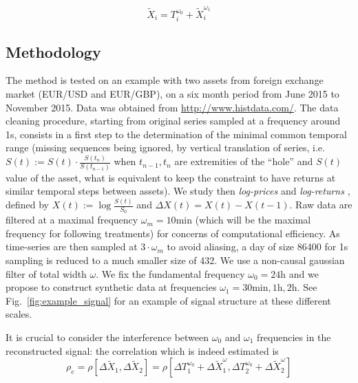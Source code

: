 \documentclass{bmcart}
\begin{document}
\begin{equation}
\tilde{X}_i = T_i^{\omega_0} + \tilde{X}_i^{\omega_1}
\end{equation}



\subsection*{Methodology}

The method is tested on an example with two assets from foreign exchange market (EUR/USD and EUR/GBP), on a six month period from June 2015 to November 2015. Data was obtained from \url{http://www.histdata.com/}. The data cleaning procedure, starting from original series sampled at a frequency around 1s, consists in a first step to the determination of the minimal common temporal range (missing sequences being ignored, by vertical translation of series, i.e. $S(t):=S(t)\cdot \frac{S(t_{n})}{S(t_{n-1})}$ when $t_{n-1},t_n$ are extremities of the ``hole'' and $S(t)$ value of the asset, what is equivalent to keep the constraint to have returns at similar temporal steps between assets). We study then \emph{log-prices} and \emph{log-returns} \cite{mantegna1999introduction}, defined by $X(t):=\log{\frac{S(t)}{S_0}}$ and $\Delta X (t) = X(t) - X(t-1)$. Raw data are filtered at a maximal frequency $\omega_m = 10\textrm{min}$ (which will be the maximal frequency for following treatments) for concerns of computational efficiency. As time-series are then sampled at $3\cdot\omega_m$ to avoid aliasing, a day of size 86400 for 1s sampling is reduced to a much smaller size of 432. We use a non-causal gaussian filter of total width $\omega$. We fix the fundamental frequency $\omega_0=24\textrm{h}$ and we propose to construct synthetic data at frequencies $\omega_1 = 30\textrm{min},1\textrm{h},2\textrm{h}$. See Fig.~\ref{fig:example_signal} for an example of signal structure at these different scales.





It is crucial to consider the interference between $\omega_0$ and $\omega_1$ frequencies in the reconstructed signal: the correlation which is indeed estimated is 
\[
\rho_{e} = \rho \left[ \Delta \tilde{X}_1 , \Delta \tilde{X}_2 \right] = \rho \left[ \Delta T_1^{\omega_0} + \Delta \tilde{X}_1^{\omega} , \Delta T_2^{\omega_0} + \Delta \tilde{X}_2^{\omega}\right]
\]
\end{document}

